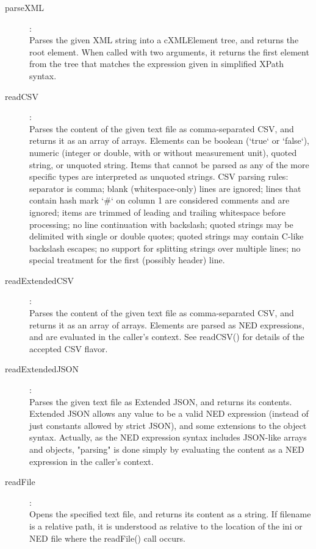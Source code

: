 \begin{description}
\item[parseXML]:  \\
    Parses the given XML string into a cXMLElement tree, and returns the root
    element. When called with two arguments, it returns the first element from
    the tree that matches the expression given in simplified XPath syntax.

\item[readCSV]:  \\
    Parses the content of the given text file as comma-separated CSV, and
    returns it as an array of arrays. Elements can be boolean (`true` or
    `false`), numeric (integer or double, with or without measurement unit),
    quoted string, or unquoted string. Items that cannot be parsed as any of
    the more specific types are interpreted as unquoted strings. CSV parsing
    rules: separator is comma; blank (whitespace-only) lines are ignored; lines
    that contain hash mark `\#` on column 1 are considered comments and are
    ignored; items are trimmed of leading and trailing whitespace before
    processing; no line continuation with backslash; quoted strings may be
    delimited with single or double quotes; quoted strings may contain C-like
    backslash escapes; no support for splitting strings over multiple lines; no
    special treatment for the first (possibly header) line.

\item[readExtendedCSV]:  \\
    Parses the content of the given text file as comma-separated CSV, and
    returns it as an array of arrays. Elements are parsed as NED expressions,
    and are evaluated in the caller's context. See readCSV() for details of the
    accepted CSV flavor.

\item[readExtendedJSON]:  \\
    Parses the given text file as Extended JSON, and returns its contents.
    Extended JSON allows any value to be a valid NED expression (instead of
    just constants allowed by strict JSON), and some extensions to the object
    syntax. Actually, as the NED expression syntax includes JSON-like arrays
    and objects, "parsing" is done simply by evaluating the content as a NED
    expression in the caller's context.

\item[readFile]:  \\
    Opens the specified text file, and returns its content as a string. If
    filename is a relative path, it is understood as relative to the location
    of the ini or NED file where the readFile() call occurs.


\end{description}
